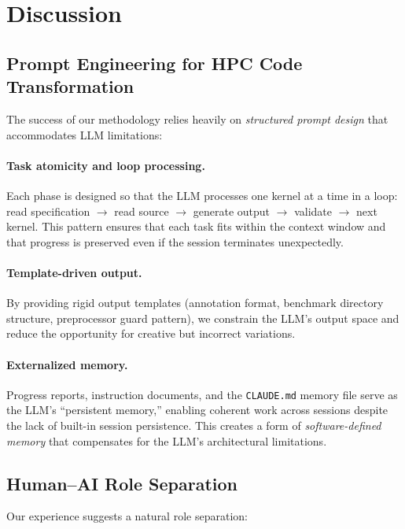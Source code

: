 \documentclass[conference]{IEEEtran}
\begin{document}
\section{Discussion}
\label{sec:discussion}

\subsection{Prompt Engineering for HPC Code Transformation}

The success of our methodology relies heavily on \emph{structured prompt
design} that accommodates LLM limitations:

\paragraph{Task atomicity and loop processing.}
Each phase is designed so that the LLM processes one kernel at a time in a
loop: read specification $\rightarrow$ read source $\rightarrow$ generate
output $\rightarrow$ validate $\rightarrow$ next kernel. This pattern ensures
that each task fits within the context window and that progress is preserved
even if the session terminates unexpectedly.

\paragraph{Template-driven output.}
By providing rigid output templates (annotation format, benchmark directory
structure, preprocessor guard pattern), we constrain the LLM's output space
and reduce the opportunity for creative but incorrect variations.

\paragraph{Externalized memory.}
Progress reports, instruction documents, and the \texttt{CLAUDE.md} memory
file serve as the LLM's ``persistent memory,'' enabling coherent work across
sessions despite the lack of built-in session persistence. This creates a
form of \emph{software-defined memory} that compensates for the LLM's
architectural limitations.

\subsection{Human--AI Role Separation}

Our experience suggests a natural role separation:
\end{document}
